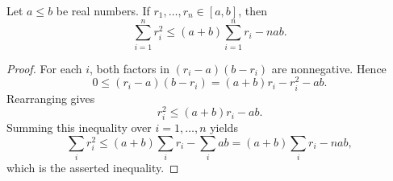 \begin{lemma}
Let $a\le b$ be real numbers.  If $r_1,\ldots,r_n\in[a,b]$, then
\[
\sum_{i=1}^n r_i^2\le
(a+b)\sum_{i=1}^n r_i-nab .
\]
\end{lemma}
\begin{proof}
For each $i$, both factors in $(r_i-a)(b-r_i)$ are nonnegative.  Hence
\[
0\le (r_i-a)(b-r_i)=(a+b)r_i-r_i^2-ab .
\]
Rearranging gives
\[
r_i^2\le (a+b)r_i-ab .
\]
Summing this inequality over $i=1,\ldots,n$ yields
\[
\sum_i r_i^2\le
(a+b)\sum_i r_i-\sum_i ab
=(a+b)\sum_i r_i-nab,
\]
which is the asserted inequality.
\end{proof}
